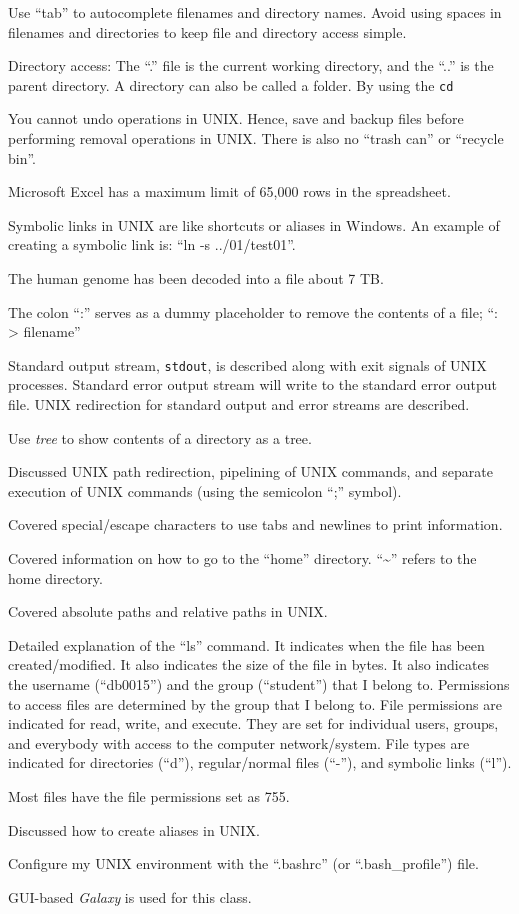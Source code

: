 Use ``tab'' to autocomplete filenames and directory names. Avoid using spaces in filenames and directories to keep file and directory access simple.

Directory access: The ``.'' file is the current working directory, and the ``..'' is the parent directory. A directory can also be called a folder. By using the {\tt cd}

You cannot undo operations in UNIX. Hence, save and backup files before performing removal operations in UNIX. There is also no ``trash can'' or ``recycle bin''.

Microsoft Excel has a maximum limit of 65,000 rows in the spreadsheet.

Symbolic links in UNIX are like shortcuts or aliases in Windows. An example of creating a symbolic link is: ``ln -s ../01/test01''.

The human genome has been decoded into a file about 7 TB.

The colon ``:'' serves as a dummy placeholder to remove the contents of a file; ``: > filename''

Standard output stream, {\tt stdout}, is described along with exit signals of UNIX processes. Standard error output stream will write to the standard error output file. UNIX redirection for standard output and error streams are described.

Use {\it tree} to show contents of a directory as a tree.

Discussed UNIX path redirection, pipelining of UNIX commands, and separate execution of UNIX commands (using the semicolon ``;'' symbol).

Covered special/escape characters to use tabs and newlines to print information.

Covered information on how to go to the ``home'' directory. ``\sim'' refers to the home directory.


Covered absolute paths and relative paths in UNIX.

Detailed explanation of the ``ls'' command. It indicates when the file has been created/modified. It also indicates the size of the file in bytes. It also indicates the username (``db0015'') and the group (``student'') that I belong to. Permissions to access files are determined by the group that I belong to. File permissions are indicated for read, write, and execute. They are set for individual users, groups, and everybody with access to the computer network/system. File types are indicated for directories (``d''), regular/normal files (``-''), and symbolic links (``l'').

Most files have the file permissions set as 755.

Discussed how to create aliases in UNIX.

Configure my UNIX environment with the ``.bashrc'' (or ``.bash_profile'') file.

GUI-based {\it Galaxy} is used for this class.












